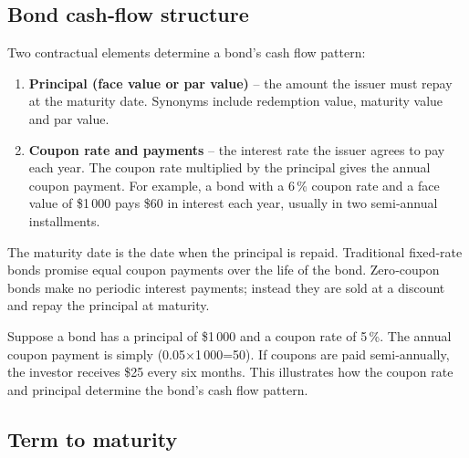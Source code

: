 \documentclass[
  letterpaper,
  DIV=11,
  numbers=noendperiod]{scrartcl}
\providecommand{\tightlist}{%
  \setlength{\itemsep}{0pt}\setlength{\parskip}{0pt}}
\begin{document}
\subsection{Bond cash‑flow structure}\label{bond-cashflow-structure}

Two contractual elements determine a bond's cash flow pattern:

\begin{enumerate}
\def\labelenumi{\arabic{enumi}.}
\tightlist
\item
  \textbf{Principal (face value or par value)} -- the amount the issuer
  must repay at the maturity date. Synonyms include redemption value,
  maturity value and par value.\\
\item
  \textbf{Coupon rate and payments} -- the interest rate the issuer
  agrees to pay each year. The coupon rate multiplied by the principal
  gives the annual coupon payment. For example, a bond with a 6\,\%
  coupon rate and a face value of \$1\,000 pays \$60 in interest each
  year, usually in two semi‑annual installments.
\end{enumerate}

The maturity date is the date when the principal is repaid. Traditional
fixed‑rate bonds promise equal coupon payments over the life of the
bond. Zero‑coupon bonds make no periodic interest payments; instead they
are sold at a discount and repay the principal at maturity.

\begin{tcolorbox}[enhanced jigsaw, titlerule=0mm, rightrule=.15mm, bottomtitle=1mm, colframe=quarto-callout-note-color-frame, opacitybacktitle=0.6, coltitle=black, breakable, toprule=.15mm, title=\textcolor{quarto-callout-note-color}{\faInfo}\hspace{0.5em}{Worked Example~1~--~Coupon calculation}, leftrule=.75mm, colbacktitle=quarto-callout-note-color!10!white, left=2mm, arc=.35mm, opacityback=0, toptitle=1mm, bottomrule=.15mm, colback=white]

Suppose a bond has a principal of \$1\,000 and a coupon rate of 5\,\%.
The annual coupon payment is simply (0.05×1\,000=50). If coupons are
paid semi‑annually, the investor receives \$25 every six months. This
illustrates how the coupon rate and principal determine the bond's cash
flow pattern.

\end{tcolorbox}

\subsection{Term to maturity}\label{term-to-maturity}
\end{document}
